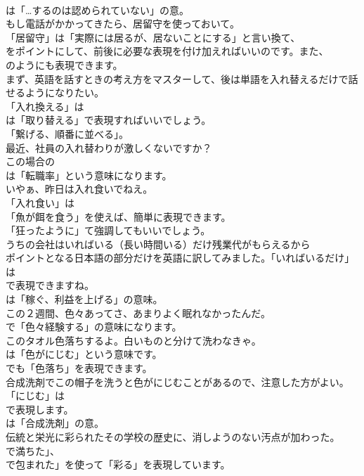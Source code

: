 \documentclass[8pt]{extreport}
\begin{document}
\begin{CJK}{UTF8}{min}
\\	は「…するのは認められていない」の意。	
\\	もし電話がかかってきたら、居留守を使っておいて。 
\\	「居留守」は「実際には居るが、居ないことにする」と言い換て、
\\	をポイントにして、前後に必要な表現を付け加えればいいのです。また、
\\	のようにも表現できます。	
\\	まず、英語を話すときの考え方をマスターして、後は単語を入れ替えるだけで話せるようになりたい。 
\\	「入れ換える」は
\\	は「取り替える」で表現すればいいでしょう。
\\	「繋げる、順番に並べる」。	
\\	最近、社員の入れ替わりが激しくないですか？ 
\\	この場合の
\\	は「転職率」という意味になります。	
\\	いやぁ、昨日は入れ食いでねえ。 
\\	「入れ食い」は
\\	「魚が餌を食う」を使えば、簡単に表現できます。
\\	「狂ったように」て強調してもいいでしょう。	
\\	うちの会社はいればいる（長い時間いる）だけ残業代がもらえるから 
\\	ポイントとなる日本語の部分だけを英語に訳してみました。「いればいるだけ」は
\\	で表現できますね。
\\	は「稼ぐ、利益を上げる」の意味。	
\\	この２週間、色々あってさ、あまりよく眠れなかったんだ。 
\\	で「色々経験する」の意味になります。	
\\	このタオル色落ちするよ。白いものと分けて洗わなきゃ。 
\\	は「色がにじむ」という意味です。
\\	でも「色落ち」を表現できます。	
\\	合成洗剤でこの帽子を洗うと色がにじむことがあるので、注意した方がよい。 
\\	「にじむ」は
\\	で表現します。
\\	は「合成洗剤」の意。	
\\	伝統と栄光に彩られたその学校の歴史に、消しようのない汚点が加わった。 
\\	で満ちた」、
\\	で包まれた」を使って「彩る」を表現しています。

\end{CJK}
\end{document}

